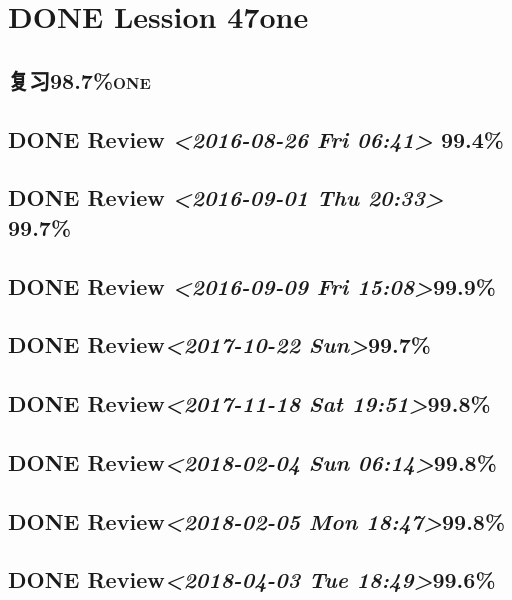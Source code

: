 \documentclass[11pt]{ctexart}
\author{mac}
\date{\today}
\title{}
\begin{document}
\tableofcontents

\section{{\bfseries\sffamily DONE} Lession 47one}
\label{sec:orge477d85}
\subsection{复习98.7\%\hfill{}\textsc{one}}
\label{sec:org88b0bec}
\subsection{{\bfseries\sffamily DONE} Review \textit{<2016-08-26 Fri 06:41> } 99.4\%}
\label{sec:org58b17c9}
\subsection{{\bfseries\sffamily DONE} Review \textit{<2016-09-01 Thu 20:33> } 99.7\%}
\label{sec:org4ea9e32}

\subsection{{\bfseries\sffamily DONE} Review \textit{<2016-09-09 Fri 15:08>}99.9\%}
\label{sec:org834716f}

\subsection{{\bfseries\sffamily DONE} Review\textit{<2017-10-22 Sun>}99.7\%}
\label{sec:org85e0459}
\subsection{{\bfseries\sffamily DONE} Review\textit{<2017-11-18 Sat 19:51>}99.8\%}
\label{sec:org879c288}
\subsection{{\bfseries\sffamily DONE} Review\textit{<2018-02-04 Sun 06:14>}99.8\%}
\label{sec:org00322c9}
\subsection{{\bfseries\sffamily DONE} Review\textit{<2018-02-05 Mon 18:47>}99.8\%}
\label{sec:org2edcb14}
\subsection{{\bfseries\sffamily DONE} Review\textit{<2018-04-03 Tue 18:49>}99.6\%}
\label{sec:orgd1d3e8e}
\end{document}
